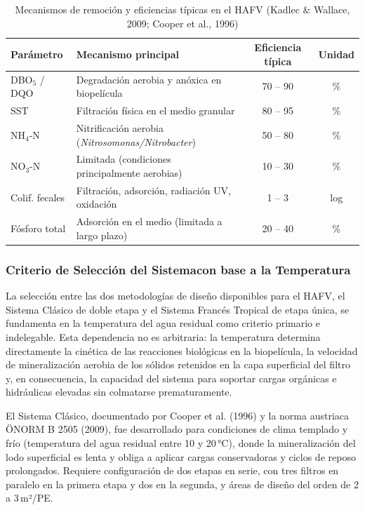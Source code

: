 \begin{table}[H]
\centering
\caption{Mecanismos de remoción y eficiencias típicas en el HAFV (Kadlec \& Wallace, 2009; Cooper et al., 1996)}
\label{tab:mecanismos_hafv}
\begin{tabular}{p{2.2cm}p{6.5cm}cc}
\toprule
\textbf{Parámetro} & \textbf{Mecanismo principal} & \textbf{Eficiencia típica} & \textbf{Unidad} \\
\midrule
DBO$_5$ / DQO & Degradación aerobia y anóxica en biopelícula & 70 -- 90 & \% \\
SST & Filtración física en el medio granular & 80 -- 95 & \% \\
NH$_4$-N & Nitrificación aerobia (\textit{Nitrosomonas/Nitrobacter}) & 50 -- 80 & \% \\
NO$_3$-N & Limitada (condiciones principalmente aerobias) & 10 -- 30 & \% \\
Colif. fecales & Filtración, adsorción, radiación UV, oxidación & 1 -- 3 & log \\
Fósforo total & Adsorción en el medio (limitada a largo plazo) & 20 -- 40 & \% \\
\bottomrule
\end{tabular}
\end{table}

\subsubsection*{Criterio de Selección del Sistemacon base a la  Temperatura}

La selección entre las dos metodologías de diseño disponibles para el HAFV, el Sistema Clásico de doble etapa y el Sistema Francés Tropical de etapa única, se fundamenta en la temperatura del agua residual como criterio primario e indelegable. Esta dependencia no es arbitraria: la temperatura determina directamente la cinética de las reacciones biológicas en la biopelícula, la velocidad de mineralización aerobia de los sólidos retenidos en la capa superficial del filtro y, en consecuencia, la capacidad del sistema para soportar cargas orgánicas e hidráulicas elevadas sin colmatarse prematuramente.

El Sistema Clásico, documentado por Cooper et al. (1996) y la norma austriaca ÖNORM B 2505 (2009), fue desarrollado para condiciones de clima templado y frío (temperatura del agua residual entre 10 y 20\,°C), donde la mineralización del lodo superficial es lenta y obliga a aplicar cargas conservadoras y ciclos de reposo prolongados. Requiere configuración de dos etapas en serie, con tres filtros en paralelo en la primera etapa y dos en la segunda, y áreas de diseño del orden de 2 a 3\,m²/PE.

